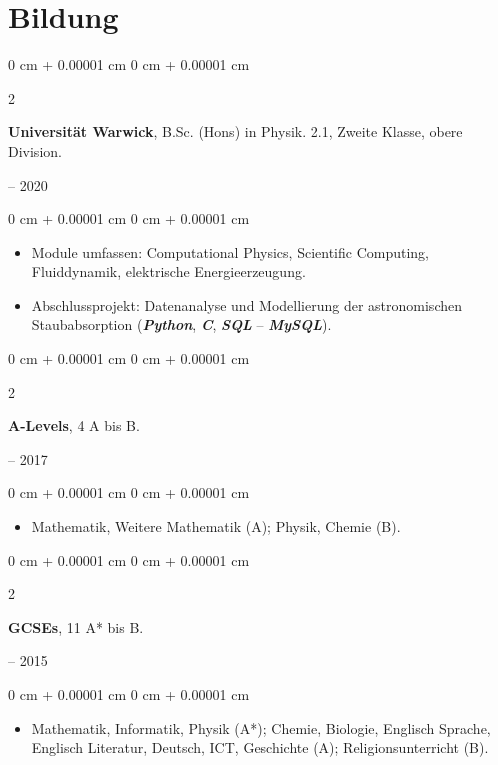 \documentclass[10pt, letterpaper]{article}
\newenvironment{highlights}{
    \begin{itemize}[
        topsep=0.2 cm,
        parsep=0.2 cm,
        partopsep=0pt,
        itemsep=0.025 cm,
        leftmargin=0 cm + 10pt
    ]
}{
    \end{itemize}
}
\newenvironment{onecolentry}{
    \begin{adjustwidth}{
        0 cm + 0.00001 cm
    }{
        0 cm + 0.00001 cm
    }
}{
    \end{adjustwidth}
}
\newenvironment{twocolentry}[2][]{
    \onecolentry
    \def\secondColumn{#2}
    \setcolumnwidth{\fill, 4.75 cm}
    \begin{paracol}{2}
}{
    \switchcolumn \raggedleft \secondColumn
    \end{paracol}
    \endonecolentry
}
\begin{document}
        \vspace{0.15 cm}

    \section{Bildung}
        \begin{twocolentry}{
            2017 – 2020
        }
            \textbf{Universität Warwick}, B.Sc. (Hons) in Physik. 2.1, Zweite Klasse, obere Division.
        \end{twocolentry}

        \vspace{0.10 cm}
        \begin{onecolentry}
            \begin{highlights}
                \item Module umfassen: Computational Physics, Scientific Computing, Fluiddynamik, elektrische Energieerzeugung.
                \item Abschlussprojekt: Datenanalyse und Modellierung der astronomischen Staubabsorption (\textbf{\textit{Python}}, \textbf{\textit{C}}, \textbf{\textit{SQL}} -- \textbf{\textit{MySQL}}).
            \end{highlights}
        \end{onecolentry}
        \vspace{0.20 cm}

        \begin{twocolentry}{
            2015 – 2017
        }
            \textbf{A-Levels}, 4 A bis B.
        \end{twocolentry}

        \vspace{0.10 cm}
        \begin{onecolentry}
            \begin{highlights}
                \item Mathematik, Weitere Mathematik (A); Physik, Chemie (B).
            \end{highlights}
        \end{onecolentry}

        \vspace{0.20 cm}
        \begin{twocolentry}{
            2010 – 2015
        }
            \textbf{GCSEs}, 11 A* bis B.
        \end{twocolentry}

        \vspace{0.10 cm}
        \begin{onecolentry}
            \begin{highlights}
            \item Mathematik, Informatik, Physik (A*); Chemie, Biologie, Englisch Sprache, Englisch Literatur, Deutsch, ICT, Geschichte (A); Religionsunterricht (B).
            \end{highlights}
        \end{onecolentry}
\end{document}
